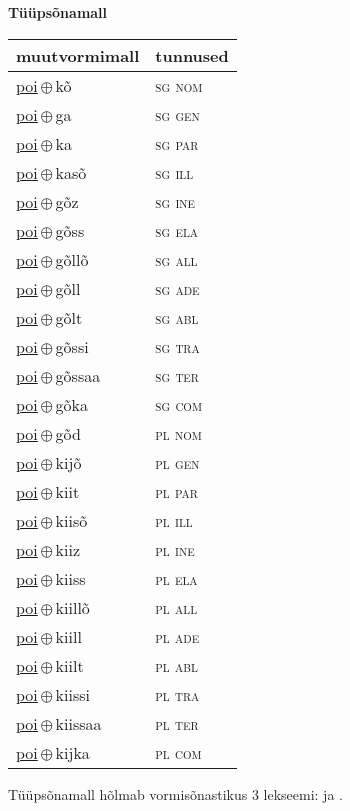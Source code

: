 

\vspace{3.5em}
\noindent \begin{minipage}{\textwidth}
\noindent \textbf{Tüüpsõnamall \,}\\

\begin{sideways}
\begin{tabular}{l l}
muutvormimall & tunnused \\
\hline
\underline{poi}\,$\oplus$\,kõ & \textsc{ sg nom } \\
\underline{poi}\,$\oplus$\,ga & \textsc{ sg gen } \\
\underline{poi}\,$\oplus$\,ka & \textsc{ sg par } \\
\underline{poi}\,$\oplus$\,kasõ & \textsc{ sg ill } \\
\underline{poi}\,$\oplus$\,gõz & \textsc{ sg ine } \\
\underline{poi}\,$\oplus$\,gõss & \textsc{ sg ela } \\
\underline{poi}\,$\oplus$\,gõllõ & \textsc{ sg all } \\
\underline{poi}\,$\oplus$\,gõll & \textsc{ sg ade } \\
\underline{poi}\,$\oplus$\,gõlt & \textsc{ sg abl } \\
\underline{poi}\,$\oplus$\,gõssi & \textsc{ sg tra } \\
\underline{poi}\,$\oplus$\,gõssaa & \textsc{ sg ter } \\
\underline{poi}\,$\oplus$\,gõka & \textsc{ sg com } \\
\underline{poi}\,$\oplus$\,gõd & \textsc{ pl nom } \\
\underline{poi}\,$\oplus$\,kijõ & \textsc{ pl gen } \\
\underline{poi}\,$\oplus$\,kiit & \textsc{ pl par } \\
\underline{poi}\,$\oplus$\,kiisõ & \textsc{ pl ill } \\
\underline{poi}\,$\oplus$\,kiiz & \textsc{ pl ine } \\
\underline{poi}\,$\oplus$\,kiiss & \textsc{ pl ela } \\
\underline{poi}\,$\oplus$\,kiillõ & \textsc{ pl all } \\
\underline{poi}\,$\oplus$\,kiill & \textsc{ pl ade } \\
\underline{poi}\,$\oplus$\,kiilt & \textsc{ pl abl } \\
\underline{poi}\,$\oplus$\,kiissi & \textsc{ pl tra } \\
\underline{poi}\,$\oplus$\,kiissaa & \textsc{ pl ter } \\
\underline{poi}\,$\oplus$\,kijka & \textsc{ pl com } \\
\end{tabular}
\end{sideways}
\label{tab:tüüpsõnamall-poikõ}

\end{minipage}

 
\vspace{1em}
\noindent Tüüpsõnamall  hõlmab vormisõnastikus 3 lekseemi:  ja .
